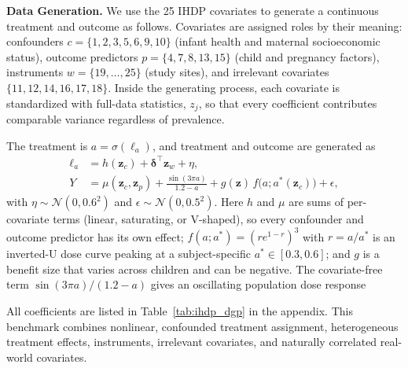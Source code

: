 \documentclass[twoside]{article}
\theoremstyle{plain}
\theoremstyle{definition}
\theoremstyle{remark}
\newtheorem{proof sketch}[theorem]{Proof Sketch}
\begin{document}
\textbf{Data Generation.}
We use the 25 IHDP covariates to generate a continuous treatment and outcome as follows. Covariates are assigned roles by their meaning: confounders $c=\{1,2,3,5,6,9,10\}$ (infant health and maternal socioeconomic status), outcome predictors $p=\{4,7,8,13,15\}$ (child and pregnancy factors), instruments $w=\{19,\ldots,25\}$ (study sites), and irrelevant covariates $\{11,12,14,16,17,18\}$. Inside the generating process, each covariate is standardized with full-data statistics, $z_j$, so that every coefficient contributes comparable variance regardless of prevalence.

The treatment is $a=\sigma(\ell_a)$, and treatment and outcome are generated as
\begin{align}
\ell_a &= h(\mathbf{z}_c) + \boldsymbol{\delta}^{\top}\mathbf{z}_w + \eta, \\
Y &= \mu(\mathbf{z}_c,\mathbf{z}_p) + \frac{\sin(3\pi a)}{1.2-a} + g(\mathbf{z})\, f\big(a; a^*(\mathbf{z}_c)\big) + \epsilon,
\end{align}
with $\eta\sim\mathcal{N}(0,0.6^2)$ and $\epsilon\sim\mathcal{N}(0,0.5^2)$.
Here $h$ and $\mu$ are sums of per-covariate terms (linear, saturating, or V-shaped), so every confounder and outcome predictor has its own effect;
$f(a;a^*)=(r e^{1-r})^3$ with $r=a/a^*$ is an inverted-U dose curve peaking at a subject-specific $a^*\in[0.3,0.6]$;
and $g$ is a benefit size that varies across children and can be negative. The covariate-free term $\sin(3\pi a)/(1.2-a)$ gives an oscillating population dose response

All coefficients are listed in Table~\ref{tab:ihdp_dgp} in the appendix. 
This benchmark combines nonlinear, confounded treatment assignment, heterogeneous treatment effects, instruments, irrelevant covariates, and naturally correlated real-world covariates.
\end{document}

